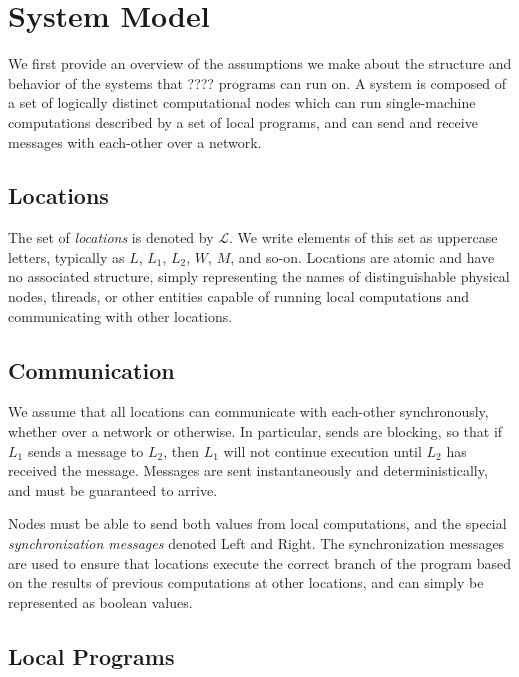 \section{System Model}
\label{sec:system_model}

We first provide an overview of the assumptions we make about the structure and behavior of the systems that ???? programs can run on.
A system is composed of a set of logically distinct computational nodes which can run single-machine computations described by a set of local programs, and can send and receive messages with each-other over a network.

\subsection{Locations}
\label{sec:locations}

The set of \emph{locations} is denoted by $\mathcal{L}$.
We write elements of this set as uppercase letters, typically as $L$, $L_1$, $L_2$, $W$, $M$, and so-on.
Locations are atomic and have no associated structure, simply representing the names of distinguishable physical nodes, threads, or other entities capable of running local computations and communicating with other locations.

\subsection{Communication}
\label{sec:communication}

We assume that all locations can communicate with each-other synchronously, whether over a network or otherwise.
In particular, sends are blocking, so that if $L_1$ sends a message to $L_2$, then $L_1$ will not continue execution until $L_2$ has received the message.
Messages are sent instantaneously and deterministically, and must be guaranteed to arrive.

Nodes must be able to send both values from local computations, and the special \emph{synchronization messages} denoted \textsf{Left} and \textsf{Right}.
The synchronization messages are used to ensure that locations execute the correct branch of the program based on the results of previous computations at other locations, and can simply be represented as boolean values.


\subsection{Local Programs}
\label{sec:local-programs}

